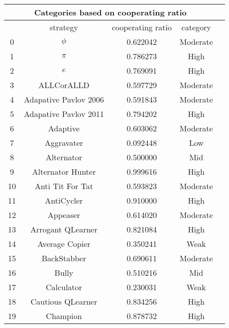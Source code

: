 		\begin{longtable}{ccccc}
				\toprule
			\multicolumn{4}{|c|}{Categories based on cooperating ratio}      \\ \hline
			    & strategy                    & cooperating ratio & category \\  \hline
			0   & $\phi$                      & 0.622042          & Moderate \\ \hline
			1   & $\pi$                       & 0.786273          & High     \\ \hline
			2   & $e$                         & 0.769091          & High     \\ \hline
			3   & ALLCorALLD                  & 0.597729          & Moderate \\ \hline
			4   & Adapative Pavlov 2006       & 0.591843          & Moderate \\ \hline
			5   & Adapative Pavlov 2011       & 0.794202          & High     \\ \hline
			6   & Adaptive                    & 0.603062          & Moderate \\ \hline
			7   & Aggravater                  & 0.092448          & Low      \\ \hline
			8   & Alternator                  & 0.500000          & Mid     \\ \hline
			9   & Alternator Hunter           & 0.999616          & High     \\ \hline
			10  & Anti Tit For Tat            & 0.593823          & Moderate \\ \hline
			11  & AntiCycler                  & 0.910000          & High     \\ \hline
			12  & Appeaser                    & 0.614020          & Moderate \\ \hline
			13  & Arrogant QLearner           & 0.821084          & High     \\ \hline
			14  & Average Copier              & 0.350241          & Weak     \\ \hline
			15  & BackStabber                 & 0.690611          & Moderate \\ \hline
			16  & Bully                       & 0.510216          & Mid     \\ \hline
			17  & Calculator                  & 0.230031          & Weak     \\ \hline
			18  & Cautious QLearner           & 0.834256          & High     \\ \hline
			19  & Champion                    & 0.878732          & High     \\ \hline

\end{longtable}
